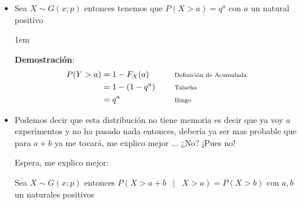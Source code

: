 \documentclass[12pt, fleqn]{report}                             %
\newenvironment{SmallIndentation}[1][0.75em]                    %
        {\begin{adjustwidth}{#1}{}\begin{footnotesize}}             %
        {\end{footnotesize}\end{adjustwidth}}                       %
\DeclareMathOperator \Space {\quad}                             %
\DeclareMathOperator \MiniSpace {\;}                            %
\newcommand \Such {\MiniSpace | \MiniSpace}                     %
\newcommand \Remember[1]{\Space\text{\scriptsize{#1}}}          %
\theoremstyle{break}                                            %
\begin{document}
                \begin{itemize}
                    
                    \item 
                        Sea $X \sim G(x; p)$ entonces tenemos que $P(X > a) = q^a$ con $a$ un natural positivo

                        \begin{SmallIndentation}[1em]
                            \textbf{Demostración}:
                            \begin{align*}
                                P(Y > a)
                                    &= 1 - F_X(a)      
                                        && \Remember{Definición de Acumulada}   \\
                                    &= 1 - (1 - q^a)    
                                        && \Remember{Talacha}                   \\
                                    &= q^a    
                                        && \Remember{Bingo}
                            \end{align*}    
                        
                        
                        \end{SmallIndentation}

                    \item 
                        Podemos decir que esta distribución no tiene memoria es decir que ya voy $a$ experimentos
                        y no ha pasado nada entonces, debería ya ser mas probable que para $a + b$ ya me tocará,
                        me explico mejor ... ¿No? ¡Pues no!

                        Espera, me explico mejor:

                        Sea $X \sim G(x; p)$ entonces $P(X > a + b \Such X > a) = P(X > b)$ 
                        con $a, b$ un naturales positivos


\end{itemize}
\end{document}
